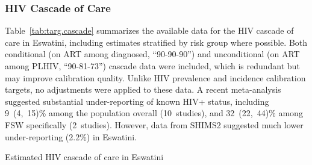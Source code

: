 \subsubsection{HIV Cascade of Care}\label{mod.cal.targ.cascade}
Table~\ref{tab:targ.cascade} summarizes the available data for the HIV cascade of care in Eswatini,
including estimates stratified by risk group where possible.
Both conditional (\eg on ART among diagnosed, ``90-90-90'')
and unconditional (\eg on ART among PLHIV, ``90-81-73'') cascade data were included,
which is redundant but may improve calibration quality.
Unlike HIV prevalence and incidence calibration targets, no adjustments were applied to these data.
A recent meta-analysis \cite{Soni2021} suggested substantial under-reporting of known HIV+ status,
including 9~(4,~15)\% among the population overall (10~studies),
and 32~(22,~44)\% among FSW specifically (2~studies).
However, data from SHIMS2 \cite{SHIMS2} suggested much lower under-reporting (2.2\%) in Eswatini.
\begin{table}
  \centering
  \caption{Estimated HIV cascade of care in Eswatini}
  \label{tab:targ.cascade}
  
\end{table}
\par
